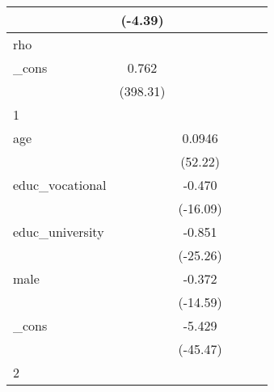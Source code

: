 {\begin{tabular}{l*{5}{c}}
            &     (-4.39)         &                     &                     &                     &                     \\
\hline
rho         &                     &                     &                     &                     &                     \\
\_cons      &       0.762\sym{***}&                     &                     &                     &                     \\
            &    (398.31)         &                     &                     &                     &                     \\
\hline
1           &                     &                     &                     &                     &                     \\
age         &                     &      0.0946\sym{***}&                     &                     &                     \\
            &                     &     (52.22)         &                     &                     &                     \\
[1em]
educ\_vocational&                     &      -0.470\sym{***}&                     &                     &                     \\
            &                     &    (-16.09)         &                     &                     &                     \\
[1em]
educ\_university&                     &      -0.851\sym{***}&                     &                     &                     \\
            &                     &    (-25.26)         &                     &                     &                     \\
[1em]
male        &                     &      -0.372\sym{***}&                     &                     &                     \\
            &                     &    (-14.59)         &                     &                     &                     \\
[1em]
\_cons      &                     &      -5.429\sym{***}&                     &                     &                     \\
            &                     &    (-45.47)         &                     &                     &                     \\
\hline
2           &                     &                     &                     &                     &                     \\

\end{tabular}}
